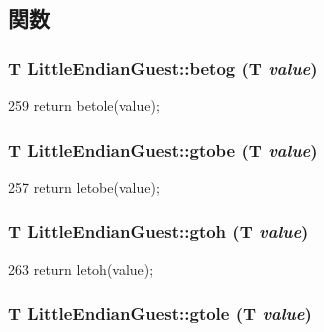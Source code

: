 \subsection{関数}
\hypertarget{namespaceLittleEndianGuest_ad2b70ae43b0a5f3901a36c4063afb95b}{
\subsubsection[{betog}]{\setlength{\rightskip}{0pt plus 5cm}T LittleEndianGuest::betog (T {\em value})}}
\label{namespaceLittleEndianGuest_ad2b70ae43b0a5f3901a36c4063afb95b}



\begin{DoxyCode}
259 {return betole(value);}
\end{DoxyCode}
\hypertarget{namespaceLittleEndianGuest_aea54106b2611ff7926651b34e2b48e50}{
\subsubsection[{gtobe}]{\setlength{\rightskip}{0pt plus 5cm}T LittleEndianGuest::gtobe (T {\em value})}}
\label{namespaceLittleEndianGuest_aea54106b2611ff7926651b34e2b48e50}



\begin{DoxyCode}
257 {return letobe(value);}
\end{DoxyCode}
\hypertarget{namespaceLittleEndianGuest_aa69faf82e7abf95025efbebedcbae1b2}{
\subsubsection[{gtoh}]{\setlength{\rightskip}{0pt plus 5cm}T LittleEndianGuest::gtoh (T {\em value})}}
\label{namespaceLittleEndianGuest_aa69faf82e7abf95025efbebedcbae1b2}



\begin{DoxyCode}
263 {return letoh(value);}
\end{DoxyCode}
\hypertarget{namespaceLittleEndianGuest_aa763802ce48ab3ae2d2f00f36dee207c}{
\subsubsection[{gtole}]{\setlength{\rightskip}{0pt plus 5cm}T LittleEndianGuest::gtole (T {\em value})}}
\label{namespaceLittleEndianGuest_aa763802ce48ab3ae2d2f00f36dee207c}



